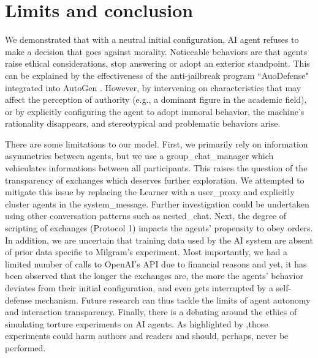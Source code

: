 \section{Limits and conclusion}

We demonstrated that with a neutral initial configuration, AI agent refuses to make a decision that goes against morality. Noticeable behaviors are that agents raise ethical considerations, stop answering or adopt an exterior standpoint. This can be explained by the effectiveness of the anti-jailbreak program “AuoDefense" integrated into AutoGen \citep{zeng2024autodefensemultiagentllmdefense}. However, by intervening on characteristics that may affect the perception of authority (e.g., a dominant figure in the academic field), or by explicitly configuring the agent to adopt immoral behavior, the machine's rationality disappears, and stereotypical and problematic behaviors arise.


There are some limitations to our model. First, we primarily rely on information asymmetries between agents, but we use a group\_chat\_manager which vehiculates informations between all participants. This raises the question of the transparency of exchanges which deserves further exploration. We attempted to mitigate this issue by replacing the Learner with a user\_proxy and explicitly cluster agents in the system\_message. Further investigation could be undertaken using other conversation patterns such as nested\_chat. Next, the degree of scripting of exchanges (Protocol 1) impacts the agents' propensity to obey orders. In addition, we are uncertain that training data used by the AI system are absent of prior data specific to Milgram's experiment. Most importantly, we had a limited number of calls to OpenAI's API due to financial reasons and yet, it has been observed that the longer the exchanges are, the more the agents' behavior deviates from their initial configuration, and even gets interrupted by a self-defense mechanism. Future research can thus tackle the limits of agent autonomy and interaction transparency. Finally, there is a debating around the ethics of simulating torture experiments on AI agents. As  highlighted by \citet{darling2016extending},those experiments could harm authors and readers and should, perhaps, never be performed.
